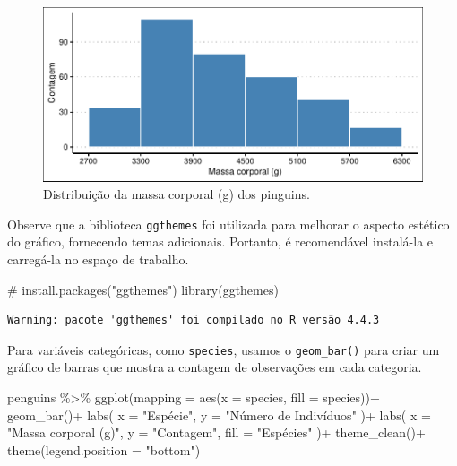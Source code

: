 \documentclass[
  12pt,
  letterpaper,
  DIV=11,
  numbers=noendperiod]{scrreprt}
\newenvironment{Shaded}{\begin{snugshade}}{\end{snugshade}}
\newcommand{\AttributeTok}[1]{\textcolor[rgb]{0.40,0.45,0.13}{#1}}
\newcommand{\CommentTok}[1]{\textcolor[rgb]{0.37,0.37,0.37}{#1}}
\newcommand{\FunctionTok}[1]{\textcolor[rgb]{0.28,0.35,0.67}{#1}}
\newcommand{\NormalTok}[1]{\textcolor[rgb]{0.00,0.23,0.31}{#1}}
\newcommand{\SpecialCharTok}[1]{\textcolor[rgb]{0.37,0.37,0.37}{#1}}
\newcommand{\StringTok}[1]{\textcolor[rgb]{0.13,0.47,0.30}{#1}}
\theoremstyle{definition}
\theoremstyle{exemplo}
\begin{document}
\begin{figure}[H]

{\centering \includegraphics{03-tidyverse_files/figure-pdf/unnamed-chunk-25-1.pdf}

}

\caption{Distribuição da massa corporal (g) dos pinguins.}

\end{figure}%

Observe que a biblioteca \texttt{ggthemes} foi utilizada para melhorar o
aspecto estético do gráfico, fornecendo temas adicionais. Portanto, é
recomendável instalá-la e carregá-la no espaço de trabalho.

\begin{Shaded}
\begin{Highlighting}[]
\CommentTok{\# install.packages("ggthemes")}
\FunctionTok{library}\NormalTok{(ggthemes)}
\end{Highlighting}
\end{Shaded}

\begin{verbatim}
Warning: pacote 'ggthemes' foi compilado no R versão 4.4.3
\end{verbatim}

Para variáveis categóricas, como \texttt{species}, usamos o
\texttt{geom\_bar()} para criar um gráfico de barras que mostra a
contagem de observações em cada categoria.

\begin{Shaded}
\begin{Highlighting}[]
\NormalTok{penguins }\SpecialCharTok{\%\textgreater{}\%} 
  \FunctionTok{ggplot}\NormalTok{(}\AttributeTok{mapping =} \FunctionTok{aes}\NormalTok{(}\AttributeTok{x =}\NormalTok{ species, }\AttributeTok{fill =}\NormalTok{ species))}\SpecialCharTok{+}
    \FunctionTok{geom\_bar}\NormalTok{()}\SpecialCharTok{+}
    \FunctionTok{labs}\NormalTok{(}
      \AttributeTok{x =} \StringTok{"Espécie"}\NormalTok{,}
      \AttributeTok{y =} \StringTok{"Número de Indivíduos"}
\NormalTok{    )}\SpecialCharTok{+}
    \FunctionTok{labs}\NormalTok{(}
        \AttributeTok{x =} \StringTok{"Massa corporal (g)"}\NormalTok{,}
        \AttributeTok{y =} \StringTok{"Contagem"}\NormalTok{,}
        \AttributeTok{fill =} \StringTok{"Espécies"}
\NormalTok{      )}\SpecialCharTok{+}
    \FunctionTok{theme\_clean}\NormalTok{()}\SpecialCharTok{+}
    \FunctionTok{theme}\NormalTok{(}\AttributeTok{legend.position =} \StringTok{"bottom"}\NormalTok{)}
\end{Highlighting}
\end{Shaded}
\end{document}
